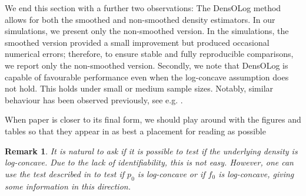 \documentclass[12pt]{article} %
\newtheorem{remark}[theorem]{Remark}
\newcommand{\comH}[1]{{\noindent \color{blue}#1}}
\begin{document}
We end this section with a further two observations:   The DensOLog method allows for both the smoothed and non-smoothed density estimators.   In our simulations, we present only the non-smoothed version.  In the simulations, the smoothed version provided a small improvement but produced occasional numerical errors; therefore, to ensure stable and fully reproducible comparisons, we report only the non-smoothed version.   Secondly, we note that DensOLog is capable of favourable performance even when the log-concave assumption does not hold.   This holds under small or medium sample sizes.   Notably, similar behaviour has been observed previously, see e.g. \citet{Cule08}.

\comH{When paper is closer to its final form, we should play around with the figures and tables so that they appear in as best a placement for reading as possible}

\begin{remark}
It is natural to ask if it is possible to test if the underlying density is log-concave.  Due to the lack of identifiability, this is not easy.  However, one can use the test described in \citet{chenSam2013} to test if $p_0$ is log-concave or if $\widehat f_0$ is log-concave, giving some information in this direction.   
\end{remark}
\end{document}
